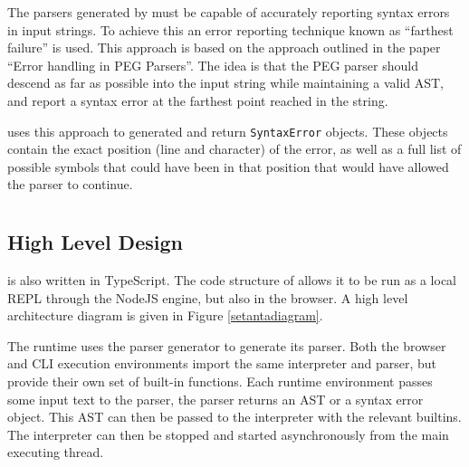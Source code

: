 The parsers generated by \tsPEG{} must be capable of accurately reporting syntax errors in input strings. To achieve this an error reporting technique known as ``farthest failure'' is used. This approach is based on the approach outlined in the paper ``Error handling in PEG Parsers''\cite{pegerrors}. The idea is that the PEG parser should descend as far as possible into the input string while maintaining a valid AST, and report a syntax error at the farthest point reached in the string.

\tsPEG{} uses this approach to generated and return \verb|SyntaxError| objects. These objects contain the exact position (line and character) of the error, as well as a full list of possible symbols that could have been in that position that would have allowed the parser to continue.

\section{\Setanta{}} \label{setantasolution}

\subsection{High Level Design}
\Setanta{} is also written in TypeScript. The code structure of \Setanta{} allows it to be run as a local REPL through the NodeJS engine, but also in the browser. A high level architecture diagram is given in Figure \ref{setantadiagram}.

The \Setanta{} runtime uses the \tsPEG{} parser generator to generate its parser. Both the browser and CLI execution environments import the same interpreter and parser, but provide their own set of built-in functions. Each runtime environment passes some input text to the parser, the parser returns an AST or a syntax error object. This AST can then be passed to the interpreter with the relevant builtins. The interpreter can then be stopped and started asynchronously from the main executing thread.

